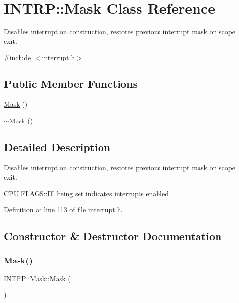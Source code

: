 \hypertarget{class_i_n_t_r_p_1_1_mask}{}\section{I\+N\+T\+RP\+:\+:Mask Class Reference}
\label{class_i_n_t_r_p_1_1_mask}


Disables interrupt on construction, restores previous interrupt mask on scope exit.  




{\ttfamily \#include $<$interrupt.\+h$>$}

\subsection*{Public Member Functions}
\begin{DoxyCompactItemize}
\item 
\hyperlink{class_i_n_t_r_p_1_1_mask_addd528b308ed524deeac0c632e07d467}{Mask} ()
\item 
\hyperlink{class_i_n_t_r_p_1_1_mask_a9510ca576c94618168e76d14521c3e6d}{$\sim$\+Mask} ()
\end{DoxyCompactItemize}


\subsection{Detailed Description}
Disables interrupt on construction, restores previous interrupt mask on scope exit. 

C\+PU \hyperlink{namespace_f_l_a_g_s_a9d5f9747a4879f4d57418def02a8fb51aec02296c8246d8621db2de2314b6728d}{F\+L\+A\+G\+S\+::\+IF} being set indicates interrupts enabled 

Definition at line 113 of file interrupt.\+h.



\subsection{Constructor \& Destructor Documentation}
\mbox{\label{class_i_n_t_r_p_1_1_mask_addd528b308ed524deeac0c632e07d467}} 
\subsubsection{\texorpdfstring{Mask()}{Mask()}}
{\footnotesize\ttfamily I\+N\+T\+R\+P\+::\+Mask\+::\+Mask (\begin{DoxyParamCaption}{ }\end{DoxyParamCaption})\hspace{0.3cm}{\ttfamily [inline]}}



